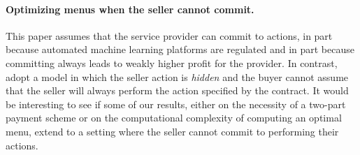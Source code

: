 

\paragraph{Optimizing menus when the seller cannot commit.}
This paper assumes that the service provider can commit to actions, in part because automated machine learning platforms are regulated and in part because committing always leads to weakly higher profit for the provider. In contrast, \citet{bernasconi2024agent} adopt a model in which the seller action is \emph{hidden} and the buyer cannot assume that the seller will always perform the action specified by the contract. It would be interesting to see if some of our results, either on the necessity of a two-part payment scheme or on the computational complexity of computing an optimal menu, extend to a setting where the seller cannot commit to performing their actions.